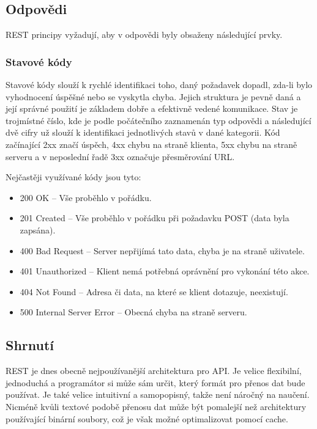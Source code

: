 \subsection{Odpovědi}
REST principy vyžadují, aby v odpovědi byly obsaženy následující prvky.

\subsubsection*{Stavové kódy}
Stavové kódy slouží k rychlé identifikaci toho, daný požadavek dopadl, zda-li bylo vyhodnocení úspěšné nebo se vyskytla chyba. Jejich struktura je pevně daná a její správné použití je základem dobře a efektivně vedené komunikace. Stav je trojmístné číslo, kde je podle počátečního zaznamenán typ odpovědi a následující dvě cifry už slouží k identifikaci jednotlivých stavů v dané kategorii. Kód začínající 2xx značí úspěch, 4xx chybu na straně klienta, 5xx chybu na straně serveru a v neposlední řadě 3xx označuje přesměrování URL.

Nejčastěji využívané kódy jsou tyto:

\begin{itemize}
    \item 200 OK -- Vše proběhlo v pořádku.
    \item 201 Created -- Vše proběhlo v pořádku při požadavku POST (data byla zapsána).
    \item 400 Bad Request -- Server nepřijímá tato data, chyba je na straně uživatele.
    \item 401 Unauthorized -- Klient nemá potřebná oprávnění pro vykonání této akce.
    \item 404 Not Found -- Adresa či data, na které se klient dotazuje, neexistují.
    \item 500 Internal Server Error -- Obecná chyba na straně serveru.
\end{itemize}


\subsection{Shrnutí}
REST je dnes obecně nejpoužívanější architektura pro API. Je velice flexibilní, jednoduchá a programátor si může sám určit, který formát pro přenos dat bude používat. Je také velice intuitivní a samopopisný, takže není náročný na naučení. Nicméně kvůli textové podobě přenosu dat může být pomalejší než architektury používající binární soubory, což je však možné optimalizovat pomocí cache.



